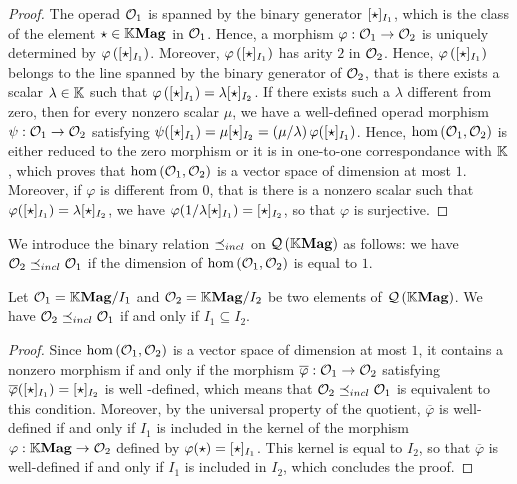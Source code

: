 \begin{proof}
  The operad $\mathcal{O}_1$ is spanned by the binary generator
  $[\operatorname{\star}]_{I_1}$, which is the class of the element
  $\operatorname{\star}\in\mathbb{K}\mathbf{Mag}$ in $\mathcal{O}_1$. Hence, a morphism
  $\varphi:\mathcal{O}_1\to\mathcal{O}_2$ is uniquely determined by
  $\varphi\left([\operatorname{\star}]_{I_1}\right)$. Moreover,
  $\varphi\left([\operatorname{\star}]_{I_1}\right)$ has arity $2$ in $\mathcal{O}_2$.
  Hence, $\varphi\left([\operatorname{\star}]_{I_1}\right)$ belongs to the line
  spanned by the binary generator of $\mathcal{O}_2$, that is there exists a
  scalar $\lambda\in\mathbb{K}$ such that $\varphi\left([\operatorname{\star}]_{I_1}\right)
  =\lambda[\operatorname{\star}]_{I_2}$. If there exists such a $\lambda$ different
  from zero, then for every nonzero scalar $\mu$, we have a well-defined
  operad morphism $\psi:\mathcal{O}_1\to\mathcal{O}_2$ satisfying
  $\psi([\operatorname{\star}]_{I_1}) =\mu[\operatorname{\star}]_{I_2}=
  \left(\mu/\lambda\right)\varphi([\operatorname{\star}]_{I_1})$. Hence,
  $\text{hom}\left(\mathcal{O}_1,\mathcal{O}_2\right)$ is either reduced to the zero
  morphism or it is in one-to-one correspondance with $\mathbb{K}$, which proves
  that $\text{hom}\left(\mathcal{O}_1,\mathcal{O}_2\right)$ is a vector space of
  dimension at most $1$. Moreover, if $\varphi$ is different from $0$,
  that is there is a nonzero scalar such that $\varphi([\operatorname{\star}]_{I_1})
  =\lambda[\operatorname{\star}]_{I_2}$, we have $\varphi(1/\lambda[\operatorname{\star}]_{I_1})
  =[\operatorname{\star}]_{I_2}$, so that $\varphi$ is surjective.
\end{proof}

We introduce the binary relation $\preceq_{incl}$ on $\mathcal{Q}\left(\mathbb{K}\mathbf{Mag}\right)$ as follows: we
have $\mathcal{O}_2\preceq_{incl}\mathcal{O}_1$ if the dimension of
$\text{hom}\left(\mathcal{O}_1,\mathcal{O}_2\right)$ is equal to $1$.

\begin{Proposition} \label{prop:order_relations_on_QMag_and_ideals}
  Let $\mathcal{O}_1=\mathbb{K}\mathbf{Mag}/I_1$ and $\mathcal{O}_2=\mathbb{K}\mathbf{Mag}/I_2$ be two elements of
  $\mathcal{Q}\left(\mathbb{K}\mathbf{Mag}\right)$.   We have $\mathcal{O}_2\preceq_{incl}\mathcal{O}_1$ if and only if
  $I_1\subseteq I_2$.
\end{Proposition}

\begin{proof}
  Since $\text{hom}\left(\mathcal{O}_1,\mathcal{O}_2\right)$ is a vector space of
  dimension at most $1$, it contains a nonzero morphism if and only if
  the morphism $\overline{\varphi}:\mathcal{O}_1\to\mathcal{O}_2$ satisfying
  $\overline{\varphi}([\operatorname{\star}]_{I_1})=[\operatorname{\star}]_{I_2}$ is well
  -defined, which means that $\mathcal{O}_2\preceq_{incl}\mathcal{O}_1$ is equivalent to this
  condition. Moreover, by the universal property of the quotient,
  $\overline{\varphi}$ is well-defined if and only if $I_1$ is included
  in the kernel of the morphism $\varphi:\mathbb{K}\mathbf{Mag}\to\mathcal{O}_2$ defined by
  $\varphi(\operatorname{\star})=[\operatorname{\star}]_{I_1}$. This kernel is equal to
  $I_2$, so that $\overline{\varphi}$ is well-defined if and only if
  $I_1$ is included in $I_2$, which concludes the proof.
\end{proof}

